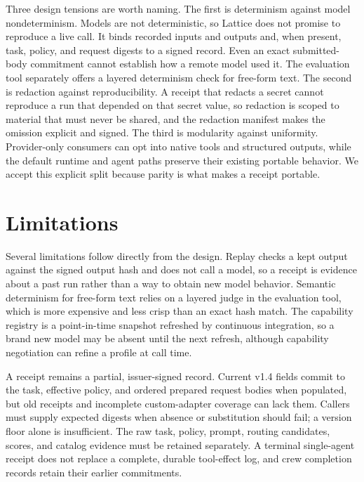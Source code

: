\documentclass[conference]{IEEEtran}
\begin{document}
Three design tensions are worth naming. The first is determinism against model
nondeterminism. Models are not deterministic, so Lattice does not promise to reproduce a
live call. It binds recorded inputs and outputs and, when present, task, policy, and
request digests to a signed record. Even an exact submitted-body commitment cannot
establish how a remote model used it. The evaluation tool separately offers a layered
determinism check for free-form text. The second is redaction against reproducibility. A receipt that redacts a
secret cannot reproduce a run that depended on that secret value, so redaction is scoped
to material that must never be shared, and the redaction manifest makes the omission
explicit and signed. The third is modularity against uniformity. Provider-only
consumers can opt into native tools and structured outputs, while the default runtime
and agent paths preserve their existing portable behavior. We accept this explicit
split because parity is what makes a receipt portable.

\section{Limitations}

Several limitations follow directly from the design. Replay checks a kept output against
the signed output hash and does not call a model, so a receipt is evidence about a past
run rather than a way to obtain new model behavior. Semantic determinism for free-form
text relies on a layered judge in the evaluation tool, which is more expensive and less
crisp than an exact hash match. The capability registry is a point-in-time snapshot
refreshed by continuous integration, so a brand new model may be absent until the next
refresh, although capability negotiation can refine a profile at call time.

A receipt remains a partial, issuer-signed record. Current v1.4 fields commit to the
task, effective policy, and ordered prepared request bodies when populated, but old
receipts and incomplete custom-adapter coverage can lack them. Callers must supply
expected digests when absence or substitution should fail; a version floor alone is
insufficient. The raw task, policy, prompt, routing candidates, scores, and catalog
evidence must be retained separately. A terminal single-agent receipt does not replace
a complete, durable tool-effect log, and crew completion records retain their earlier
commitments.
\end{document}
